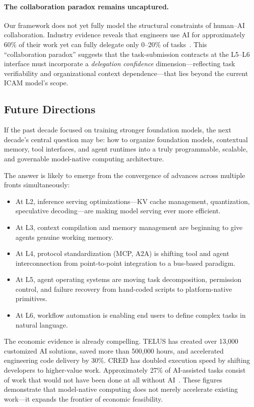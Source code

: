 \documentclass[11pt,a4paper]{article}
\begin{document}
\paragraph{The collaboration paradox remains uncaptured.}
Our framework does not yet fully model the structural constraints of human--AI collaboration. Industry evidence reveals that engineers use AI for approximately 60\% of their work yet can fully delegate only 0--20\% of tasks~\cite{anthropic2026agenticreport}. This ``collaboration paradox'' suggests that the task-submission contracts at the L5--L6 interface must incorporate a \emph{delegation confidence} dimension---reflecting task verifiability and organizational context dependence---that lies beyond the current ICAM model's scope.

\subsection{Future Directions}

If the past decade focused on training stronger foundation models, the next decade's central question may be: how to organize foundation models, contextual memory, tool interfaces, and agent runtimes into a truly programmable, scalable, and governable model-native computing architecture.

The answer is likely to emerge from the convergence of advances across multiple fronts simultaneously:
\begin{itemize}[nosep]
    \item At L2, inference serving optimizations---KV cache management, quantization, speculative decoding---are making model serving ever more efficient.
    \item At L3, context compilation and memory management are beginning to give agents genuine working memory.
    \item At L4, protocol standardization (MCP, A2A) is shifting tool and agent interconnection from point-to-point integration to a bus-based paradigm.
    \item At L5, agent operating systems are moving task decomposition, permission control, and failure recovery from hand-coded scripts to platform-native primitives.
    \item At L6, workflow automation is enabling end users to define complex tasks in natural language.
\end{itemize}

The economic evidence is already compelling. TELUS has created over 13,000 customized AI solutions, saved more than 500,000 hours, and accelerated engineering code delivery by 30\%. CRED has doubled execution speed by shifting developers to higher-value work. Approximately 27\% of AI-assisted tasks consist of work that would not have been done at all without AI~\cite{anthropic2026agenticreport}. These figures demonstrate that model-native computing does not merely accelerate existing work---it expands the frontier of economic feasibility.
\end{document}
